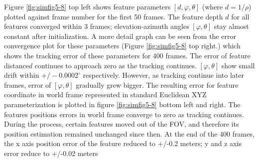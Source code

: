 Figure \ref{fig:simfig5-8} top left shows feature parameters $[d,
\varphi ,\theta]$ (where $d=1/\rho $) plotted against frame number for
the first 50 frames. The feature depth $d$ for all features converged
within 3 frames; elevation-azimuth angles $[\varphi ,\theta]$ stay
almost constant after initialization. A more detail graph can be seen
from the error convergence plot for these parameters (Figure
\ref{fig:simfig5-8} top right.) which shows the tracking error of
these parameters for 400 frames. The error of feature distance$ d$
continues to approach zero as the tracking continues. $[\varphi
,\theta]$ show small drift within $+/-0.0002^{\circ}$ respectively.
However, as tracking continue into later frames, error of $[\varphi
,\theta]$ gradually grew bigger. The resulting error for feature
coordinate in world frame represented in standard Euclidean XYZ
parameterization is plotted in figure \ref{fig:simfig5-8} bottom left
and right. The features positions errors in world frame converge to
zero as tracking continues. During the process, certain features moved
out of the FOV, and therefore its position estimation remained
unchanged since then. At the end of the 400 frames, the x axis
position error of the feature reduced to +/-0.2 meters; y and z axis
error reduce to +/-0.02 meters

